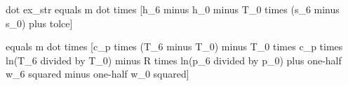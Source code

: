 dot ex_str equals m dot times [h_6 minus h_0 minus T_0 times (s_6 minus s_0) plus tolce]  

equals m dot times [c_p times (T_6 minus T_0) minus T_0 times c_p times ln(T_6 divided by T_0) minus R times ln(p_6 divided by p_0) plus one-half w_6 squared minus one-half w_0 squared]